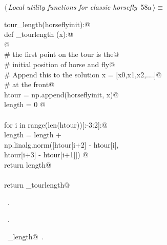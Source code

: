 \documentclass[11.5pt]{report}
\begin{document}
\begin{flushleft} \small\label{scrap80}\raggedright\small
{} $\langle\,${\itshape Local utility functions for classic horsefly}\nobreak\ {\footnotesize {58a}}$\,\rangle\equiv$
\vspace{-1ex}
\begin{list}{}{} \item
\mbox{}\verb@def tour_length(horseflyinit):@\\
\mbox{}\verb@   def _tourlength (x):@\\
\mbox{}\verb@         @\\
\mbox{}\verb@        # the first point on the tour is the@\\
\mbox{}\verb@        # initial position of horse and fly@\\
\mbox{}\verb@        # Append this to the solution x = [x0,x1,x2,....]@\\
\mbox{}\verb@        # at the front@\\
\mbox{}\verb@        htour = np.append(horseflyinit, x)@\\
\mbox{}\verb@        length = 0 @\\
\mbox{}\verb@@\\
\mbox{}\verb@        for i in range(len(htour))[:-3:2]:@\\
\mbox{}\verb@                length = length + \@\\
\mbox{}\verb@                         np.linalg.norm([htour[i+2] - htour[i], \@\\
\mbox{}\verb@                                         htour[i+3] - htour[i+1]]) @\\
\mbox{}\verb@        return length@\\
\mbox{}\verb@@\\
\mbox{}\verb@   return _tourlength@\\
\mbox{}\verb@@{\NWsep}
\end{list}
\vspace{-1.5ex}
\footnotesize
\begin{list}{}{\setlength{\itemsep}{-\parsep}\setlength{\itemindent}{-\leftmargin}}
\item \NWtxtMacroDefBy\ .
\item \NWtxtMacroRefIn\ .
\item \NWtxtIdentsDefed\nobreak\  \verb@tour_length@\nobreak\ .
\item{}
\end{list}
\vspace{4ex}
\end{flushleft}
\end{document}

